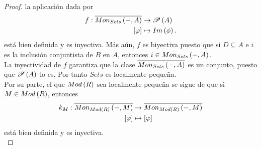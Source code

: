 \documentclass{article}
\begin{document}
\begin{enumerate}[label=\textbf{Ej \arabic*.}]
\begin{proof}
			la aplicación dada por
			\begin{align*}
				f: \overline{Mon_{Sets}\left(-,A\right)} &\rightarrow \mathscr{P}\left(A\right)\\ \left[\varphi\right] &\mapsto Im\left(\phi\right).
			\end{align*}
			está bien definida y es inyectiva. Más aún, $f$ es biyectiva puesto que si $D\subseteq A$  e $i$ es la inclusión conjuntista de $B$ en $A$, entonces $i\in Mon_{Sets}\left(-,A\right)$.\\
			La inyectividad de $f$ garantiza que la clase $\overline{Mon_{Sets}\left(-,A\right)}$ es un conjunto, puesto que $\mathscr{P}\left(A\right)$ lo es. Por tanto $Sets$ es localmente pequeña.\\
			
			Por su parte, el que $Mod\left(R\right)$ sea localmente pequeña se sigue de que si $M\in Mod\left(R\right)$, entonces
			\begin{align*}
				k_M: \overline{Mon_{Mod\left(R\right)}\left(-,M\right)} &\rightarrow \overline{Mon_{Mod\left(R\right)}\left(-,M\right)}\\ \left[\varphi\right] &\mapsto \left[\varphi\right]
			\end{align*}
			está bien definida y es inyectiva.\\
		\end{proof}
	\end{enumerate}		
\end{document}
